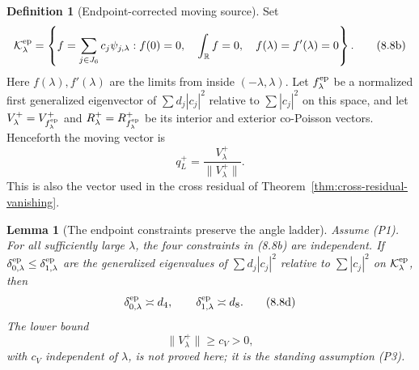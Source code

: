 \documentclass[11pt]{amsart}
\newtheorem{lemma}[theorem]{Lemma}
\theoremstyle{definition}
\newtheorem{definition}[theorem]{Definition}
\theoremstyle{remark}
\begin{document}
\begin{definition}[Endpoint-corrected moving source]
\label{def:endpoint-corrected-source}
Set
\[
 \mathcal K_\lambda^{\rm ep}
 =\left\{
 f=\sum_{j\in J_6}c_j\psi_{j,\lambda}:
 f(0)=0,\quad \int_{\mathbb R}f=0,\quad
 f(\lambda)=f'(\lambda)=0
 \right\}.
\tag{8.8b}
\]
Here \(f(\lambda),f'(\lambda)\) are the limits from inside
\((-\lambda,\lambda)\).
Let \(f_\lambda^{\rm ep}\) be a normalized first generalized eigenvector
of \(\sum d_j|c_j|^2\) relative to \(\sum|c_j|^2\) on this space, and let
\(V_\lambda^+=V^+_{f_\lambda^{\rm ep}}\) and
\(R_\lambda^+=R^+_{f_\lambda^{\rm ep}}\) be its interior and exterior
co-Poisson vectors.  Henceforth the moving vector is
\[
 q_L^+=\frac{V_\lambda^+}{\|V_\lambda^+\|}.
\tag{8.8c}
\]
This is also the vector used in the cross residual of
Theorem~\ref{thm:cross-residual-vanishing}.
\end{definition}

\begin{lemma}[The endpoint constraints preserve the angle ladder]
\label{lem:endpoint-angle-ladder}
Assume (P1).  For all sufficiently large \(\lambda\), the four
constraints in
(8.8b) are independent.  If
\(\delta_{0,\lambda}^{\rm ep}\le
\delta_{1,\lambda}^{\rm ep}\) are the generalized eigenvalues of
\(\sum d_j|c_j|^2\) relative to \(\sum|c_j|^2\) on
\(\mathcal K_\lambda^{\rm ep}\), then
\[
 \delta_{0,\lambda}^{\rm ep}\asymp d_4,
 \qquad
 \delta_{1,\lambda}^{\rm ep}\asymp d_8.
\tag{8.8d}
\]
The lower bound
\[
 \|V_\lambda^+\|\ge c_V>0,
\tag{8.8e}
\]
with \(c_V\) independent of \(\lambda\), is not proved here; it is the
standing assumption (P3).
\end{lemma}
\end{document}
